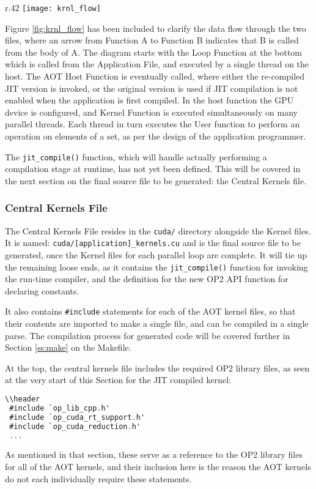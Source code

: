 \begin{wrapfigure}{r}{.42\textwidth}
  \centering
  \texttt{[image: krnl\_flow]}
  \caption{Kernel Flow}
  \label{fig:krnl_flow}
\end{wrapfigure}

Figure \ref{fig:krnl_flow} has been included to clarify the data flow through the two files, where an arrow from Function A to Function B indicates that B is called from the body of A. The diagram starts with the Loop Function at the bottom which is called from the Application File, and executed by a single thread on the host. The AOT Host Function is eventually called, where either the re-compiled JIT version is invoked, or the original version is used if JIT compilation is not enabled when the application is first compiled. In the host function the GPU device is configured, and Kernel Function is executed simultaneously on many parallel threads. Each thread in turn executes the User function to perform an operation on elements of a set, as per the design of the application programmer.

The \verb|jit_compile()| function, which will handle actually performing a compilation stage at runtime, has not yet been defined. This will be covered in the next section on the final source file to be generated: the Central Kernels file.
\clearpage
\subsubsection{Central Kernels File}
\label{sss:mkf}
The Central Kernels File resides in the \verb|cuda/| directory alongside the Kernel files. It is named: \verb|cuda/[application]_kernels.cu| and is the final source file to be generated, once the Kernel files for each parallel loop are complete. It will tie up the remaining loose ends, as it contains the \verb|jit_compile()| function for invoking the run-time compiler, and the definition for the new OP2 API function for declaring constants.
\par It also contains \verb|#include| statements for each of the AOT kernel files, so that their contents are imported to make a single file, and can be compiled in a single parse. The compilation process for generated code will be covered further in Section \ref{ss:make} on the Makefile.
\par
At the top, the central kernels file includes the required OP2 library files, as seen at the very start of this Section for the JIT compiled kernel:
\begin{lstlisting}[backgroundcolor = \color{red!20}, language=C]
\\header
 #include `op_lib_cpp.h'
 #include `op_cuda_rt_support.h'
 #include `op_cuda_reduction.h'
 ...
\end{lstlisting}
As mentioned in that section, these serve as a reference to the OP2 library files for all of the AOT kernels, and their inclusion here is the reason the AOT kernels do not each individually require these statements.

